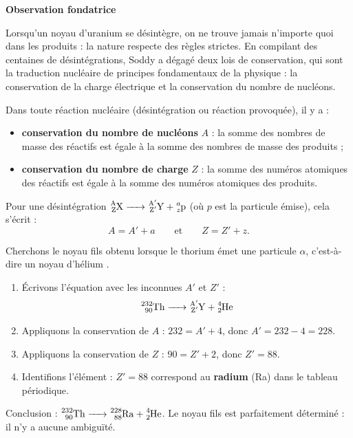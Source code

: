 \documentclass[11pt]{article}
\begin{document}
\textbf{Observation fondatrice}\par

Lorsqu'un noyau d'uranium se désintègre, on ne trouve jamais n'importe quoi dans les produits : la nature respecte des règles strictes. En compilant des centaines de désintégrations, Soddy a dégagé deux lois de conservation, qui sont la traduction nucléaire de principes fondamentaux de la physique : la conservation de la charge électrique et la conservation du nombre de nucléons.

\begin{propriete}
Dans toute réaction nucléaire (désintégration ou réaction provoquée), il y a :
\begin{itemize}
\item \textbf{conservation du nombre de nucléons} $A$ : la somme des nombres de masse des réactifs est égale à la somme des nombres de masse des produits ;
\item \textbf{conservation du nombre de charge} $Z$ : la somme des numéros atomiques des réactifs est égale à la somme des numéros atomiques des produits.
\end{itemize}
Pour une désintégration $\ce{^{A}_{Z}X -> ^{A'}_{Z'}Y + ^{a}_{z}p}$ (où $p$ est la particule émise), cela s'écrit :
\[ A = A' + a \qquad \text{et} \qquad Z = Z' + z. \]
\end{propriete}

\begin{experience}
Cherchons le noyau fils obtenu lorsque le thorium  émet une particule $\alpha$, c'est-à-dire un noyau d'hélium .
\begin{enumerate}
\item Écrivons l'équation avec les inconnues $A'$ et $Z'$ :
\[ \ce{^{232}_{90}Th -> ^{A'}_{Z'}Y + ^{4}_{2}He} \]
\item Appliquons la conservation de $A$ : $232 = A' + 4$, donc $A' = 232 - 4 = 228$.
\item Appliquons la conservation de $Z$ : $90 = Z' + 2$, donc $Z' = 88$.
\item Identifions l'élément : $Z' = 88$ correspond au \textbf{radium} (Ra) dans le tableau périodique.
\end{enumerate}
Conclusion : $\ce{^{232}_{90}Th -> ^{228}_{88}Ra + ^{4}_{2}He}$. Le noyau fils est parfaitement déterminé : il n'y a aucune ambiguïté.
\end{experience}
\end{document}
